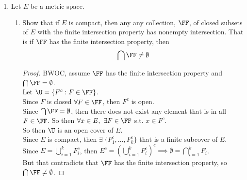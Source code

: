 \documentclass[14pt]{extarticle}
\begin{document}
\begin{enumerate}
\begin{enumerate}
			\item For $\vec{a},\vec{b} \in \R^2$ define the segment with endpoints $\vec{a}$ and $\vec{b}$ as 
			\[[\vec{a},\vec{b}] = \{(1-t)\vec{a}+t\vec{b} : 0 \leq t \leq 1\}\]
			Prove $[\vec{a},\vec{b}]$ is connected.
			\begin{proof}
				BWOC, let $[\vec{a},\vec{b}] = A \cupdot B$ be a disconnection.\\
				Let $A_0 = \{t \in [0,1] : (1-t)\vec{a}+t\vec{b} \in A\}$ and similarly for $B_0$.\\
				We can rewrite $A_0$ as $\{t \in [0,1] : f(t) \in A\}$ and similarly for $B_0$.\\
				We know that $f$ is Lipschitz from $(a)$ and since both $A$ and $B$ are open (know from them being a disconnection), Problem 2 tells us that the preimage of $A$ and $B$ through $f$ is also open. So $A_0$ and $B_0$ are both open.\\
				Since $A$ and $B$ are disjoint, so will $A_0$ and $B_0$ since taking the preimage preserves that property.\\
				Obviously $A_0 \neq \emptyset \neq B_0$ and $A_0 \cup B_0 = [0,1]$.\\
				So then $A_0 \cupdot B_0$ is a disconnection of $[0,1]$, which is a contradiction since closed intervals of the reals are connected.\\
				So then the disconnection $A \cupdot B$ cannot exist, making $\vec{a},\vec{b}]$ connected.
			\end{proof}
		\end{enumerate}
	
		\item Let $E$ be a metric space.
		\begin{enumerate}
			\item Show that if $E$ is compact, then any any collection, $\FF$, of closed subsets of $E$ with the finite intersection property has nonempty intersection. That is if $\FF$ has the finite intersection property, then \[\bigcap\FF\neq\emptyset\]
			\begin{proof}
				BWOC, assume $\FF$ has the finite intersection property and $\bigcap\FF=\emptyset$.\\
				Let $\U = \{F^c : F \in \FF\}$.\\
				Since $F$ is closed $\forall F \in \FF$, then $F^c$ is open.\\
				Since $\bigcap\FF=\emptyset$, then there does not exist any element that is in all $F\in\FF$. So then $\forall x\in E,\ \exists F\in\FF$ s.t. $x\in F^c$.\\
				So then $\U$ is an open cover of $E$.\\
				Since $E$ is compact, then $\exists\ \{F_1^c,\ldots,F_k^c\}$ that is a finite subcover of $E$.\\
				Since $E = \bigcup_{i=1}^k F_i^c$, then $E^c = (\bigcup_{i=1}^k F_i^c)^c \implies \emptyset = \bigcap_{i=1}^k F_i$.\\
				But that contradicts that $\FF$ has the finite intersection property, so $\bigcap\FF\neq\emptyset$.
			\end{proof}
		

\end{enumerate}
\end{enumerate}
\end{document}
